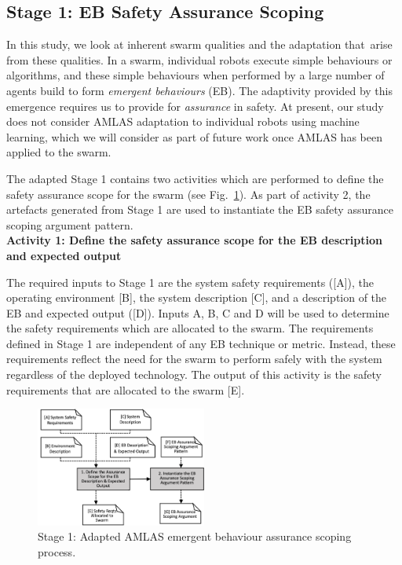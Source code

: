 \documentclass[lettersize,journal]{IEEEtran}
\begin{document}
\subsection{Stage 1: EB Safety Assurance Scoping} \label{framework-stage1}
In this study, we look at inherent swarm qualities and the adaptation that arise from these qualities. 
In a swarm, individual robots execute simple behaviours or algorithms, and these simple behaviours when performed by a large number of agents build to form \emph{emergent behaviours} (EB). 
The adaptivity provided by this emergence requires us to provide for \textit{assurance} in safety. 
At present, our study does not consider AMLAS adaptation to individual robots using machine learning, which we will consider as part of future work once AMLAS has been applied to the swarm.

The adapted Stage 1 contains two activities which are performed to define the safety assurance scope for the swarm (see Fig.~\ref{amlas-a-stage1}).  
As part of activity 2, the artefacts generated from Stage 1 are used to instantiate the EB safety assurance scoping argument pattern. \\

\noindent \textbf{Activity 1: Define the safety assurance scope for the EB description and expected output}

The required inputs to Stage 1 are the system safety requirements ([A]), the operating environment [B],  the system description [C], and a description of the EB and expected output ([D]). 
Inputs A, B, C and D will be used to determine the safety requirements which are allocated to the swarm. 
The requirements defined in Stage 1 are independent of any EB technique or metric.
Instead, these requirements reflect the need for the swarm to perform safely with the system regardless of the deployed technology. 
The output of this activity is the safety requirements that are allocated to the swarm [E]. 
\begin{figure}[!t]
	\centering
	\includegraphics[width=0.5\textwidth]{figures/amlas-a-stage1-v2.png}
	\caption{Stage 1: Adapted AMLAS emergent behaviour assurance scoping process.}
	\label{amlas-a-stage1}
\end{figure}
\\
\end{document}
